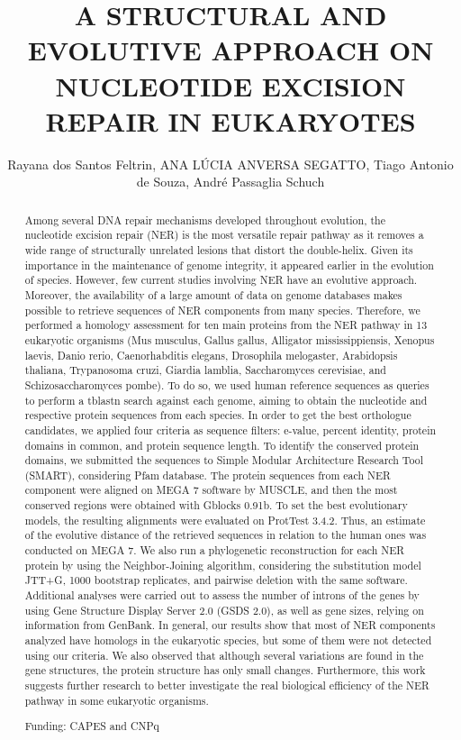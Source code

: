 \documentclass[twoside]{article}
\title{\vspace{-15mm}\fontsize{24pt}{10pt}\selectfont\textbf{ A STRUCTURAL AND EVOLUTIVE APPROACH ON NUCLEOTIDE EXCISION REPAIR IN EUKARYOTES }} %
\author{ Rayana dos Santos Feltrin, ANA L\'UCIA ANVERSA SEGATTO, Tiago Antonio de Souza, Andr\'e Passaglia Schuch }
\affil{ Universidade Federal de Santa Maria }
\date{}
\begin{document}
  
  
  \maketitle %
  
  
  \thispagestyle{fancy} %
  
  
  \begin{abstract}
  Among several DNA repair mechanisms developed throughout evolution,  the nucleotide excision repair (NER) is the most versatile repair pathway as it removes a wide range of structurally unrelated lesions that distort the double-helix. Given its importance in the maintenance of genome integrity,  it appeared earlier in the evolution of species. However,  few current studies involving NER have an evolutive approach. Moreover,  the availability of a large amount of data on genome databases makes possible to retrieve sequences of NER components from many species. Therefore,  we performed a homology assessment for ten main proteins from the NER pathway in 13 eukaryotic organisms (Mus musculus,  Gallus gallus,  Alligator mississippiensis,  Xenopus laevis,  Danio rerio,  Caenorhabditis elegans,  Drosophila melogaster,  Arabidopsis thaliana,  Trypanosoma cruzi,  Giardia lamblia,  Saccharomyces cerevisiae,  and Schizosaccharomyces pombe). To do so,  we used human reference sequences as queries to perform a tblastn search against each genome,  aiming to obtain the nucleotide and respective protein sequences from each species. In order to get the best orthologue candidates,  we applied four criteria as sequence filters: e-value,  percent identity,  protein domains in common,  and protein sequence length. To identify the conserved protein domains,  we submitted the sequences to Simple Modular Architecture Research Tool (SMART),  considering Pfam database. The protein sequences from each NER component were aligned on MEGA 7 software by MUSCLE,  and then the most conserved regions were obtained with Gblocks 0.91b. To set the best evolutionary models,  the resulting alignments were evaluated on ProtTest 3.4.2. Thus,  an estimate of the evolutive distance of the retrieved sequences in relation to the human ones was conducted on MEGA 7. We also run a phylogenetic reconstruction for each NER protein by using the Neighbor-Joining algorithm,  considering the substitution model JTT+G,  1000 bootstrap replicates,  and pairwise deletion with the same software. Additional analyses were carried out to assess the number of introns of the genes by using Gene Structure Display Server 2.0 (GSDS 2.0),  as well as gene sizes,  relying on information from GenBank. In general,  our results show that most of NER components analyzed have homologs in the eukaryotic species,  but some of them were not detected using our criteria. We also observed that although several variations are found in the gene structures,  the protein structure has only small changes. Furthermore,  this work suggests further research to better investigate the real biological efficiency of the NER pathway in some eukaryotic organisms.
  
  Funding: CAPES and CNPq \\ 
  \end{abstract}
  
\end{document}

